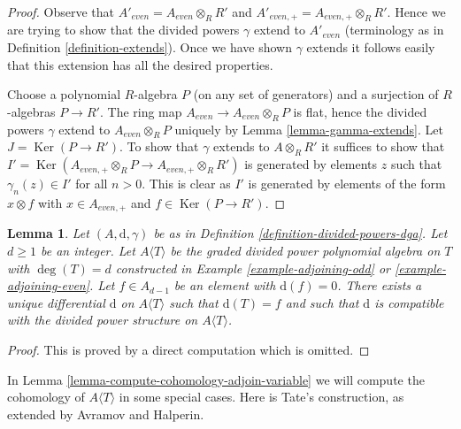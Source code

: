 \documentclass{stacks-project}
\theoremstyle{plain}
\newtheorem{lemma}[subsection]{Lemma}
\theoremstyle{definition}
\theoremstyle{remark}
\numberwithin{equation}{subsection}
\def\Ker{\mathop{\mathrm{Ker}}}
\begin{document}
\begin{proof}
Observe that $A'_{even} = A_{even} \otimes_R R'$ and
$A'_{even, +} = A_{even, +} \otimes_R R'$. Hence we are trying to
show that the divided powers $\gamma$ extend to $A'_{even}$
(terminology as in Definition \ref{definition-extends}).
Once we have shown $\gamma$ extends it follows easily that this
extension has all the desired properties.

\medskip\noindent
Choose a polynomial $R$-algebra $P$ (on any set of generators)
and a surjection of $R$-algebras
$P \to R'$. The ring map $A_{even} \to A_{even} \otimes_R P$ is flat,
hence the divided powers $\gamma$ extend to $A_{even} \otimes_R P$
uniquely by Lemma \ref{lemma-gamma-extends}.
Let $J = \Ker(P \to R')$. To show that $\gamma$ extends
to $A \otimes_R R'$ it suffices to show that
$I' = \Ker(A_{even, +} \otimes_R P \to A_{even, +} \otimes_R R')$
is generated by elements $z$ such that $\gamma_n(z) \in I'$
for all $n > 0$. This is clear as $I'$ is generated by elements
of the form $x \otimes f$ with
$x \in A_{even, +}$ and $f \in \Ker(P \to R')$.
\end{proof}

\begin{lemma}
\label{lemma-extend-differential}
Let $(A, \text{d}, \gamma)$ be as in
Definition \ref{definition-divided-powers-dga}.
Let $d \geq 1$ be an integer.
Let $A\langle T \rangle$ be the graded divided power polynomial algebra
on $T$ with $\deg(T) = d$
constructed in Example \ref{example-adjoining-odd} or
\ref{example-adjoining-even}.
Let $f \in A_{d - 1}$ be an element with $\text{d}(f) = 0$.
There exists a unique differential $\text{d}$
on $A\langle T\rangle$ such that $\text{d}(T) = f$ and
such that $\text{d}$ is compatible with the divided power
structure on $A\langle T \rangle$.
\end{lemma}

\begin{proof}
This is proved by a direct computation which is omitted.
\end{proof}

\noindent
In Lemma \ref{lemma-compute-cohomology-adjoin-variable}
we will compute the cohomology of $A\langle T \rangle$ in some special cases.
Here is Tate's construction, as extended
by Avramov and Halperin.
\end{document}
